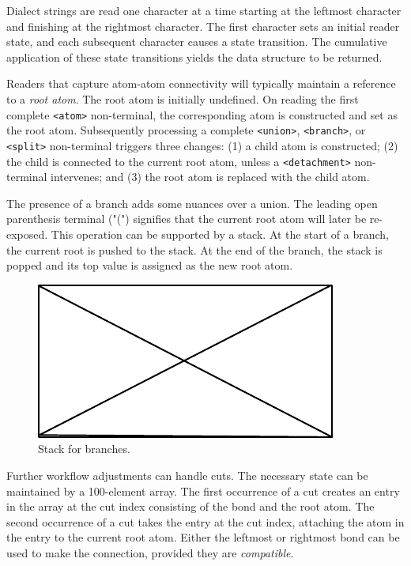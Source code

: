 \documentclass{article}
\def\ttt{\texttt}
\begin{document}
Dialect strings are read one character at a time starting at the leftmost character and finishing at the rightmost character. The first character sets an initial reader state, and each subsequent character causes a state transition. The cumulative application of these state transitions yields the data structure to be returned.

Readers that capture atom-atom connectivity will typically maintain a reference to a \textit{root atom}. The root atom is initially undefined. On reading the first complete \ttt{<atom>} non-terminal, the corresponding atom is constructed and set as the root atom. Subsequently processing a complete \ttt{<union>}, \ttt{<branch>}, or \ttt{<split>} non-terminal triggers three changes: (1) a child atom is constructed; (2) the child is connected to the current root atom, unless a \ttt{<detachment>} non-terminal intervenes; and (3) the root atom is replaced with the child atom.

The presence of a branch adds some nuances over a union. The leading open parenthesis terminal ("(") signifies that the current root atom will later be re-exposed. This operation can be supported by a stack. At the start of a branch, the current root is pushed to the stack. At the end of the branch, the stack is popped and its top value is assigned as the new root atom.

\begin{figure}
    \centering
    \includegraphics{filler}
    \caption{Stack for branches.}
    \label{fig:branches-stack}
\end{figure}

Further workflow adjustments can handle cuts. The necessary state can be maintained by a 100-element array. The first occurrence of a cut creates an entry in the array at the cut index consisting of the bond and the root atom. The second occurrence of a cut takes the entry at the cut index, attaching the atom in the entry to the current root atom. Either the leftmost or rightmost bond can be used to make the connection, provided they are \textit{compatible}.
\end{document}
